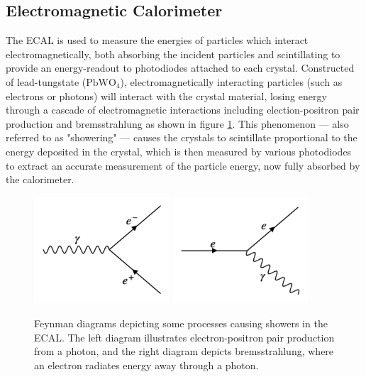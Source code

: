 \subsection{Electromagnetic Calorimeter}
\label{subsec:ecal}
The ECAL is used to measure the energies of particles which interact electromagnetically, both absorbing the incident particles and scintillating to provide an energy-readout to photodiodes attached to each crystal. Constructed of lead-tungstate ($\text{PbWO}_4$), electromagnetically interacting particles (such as electrons or photons) will interact with the crystal material, losing energy through a cascade of electromagnetic interactions including election-positron pair production and bremsstrahlung as shown in figure \ref{fig:ecalFeynman}. This phenomenon --- also referred to as "showering" --- causes the crystals to scintillate proportional to the energy deposited in the crystal, which is then measured by various photodiodes to extract an accurate measurement of the particle energy, now fully absorbed by the calorimeter.
\begin{figure}
	\centering
	\includegraphics[width=0.45\textwidth]{detector/figs/pairProduction}
	\includegraphics[width=0.45\textwidth]{detector/figs/brem}
	\renewcommand{\baselinestretch}{1.0}
	\caption[Feynman diagrams depicting some processes causing showers in the ECAL.]{Feynman diagrams depicting some processes causing showers in the ECAL. The left diagram illustrates electron-positron pair production from a photon, and the right diagram depicts bremsstrahlung, where an electron radiates energy away through a photon.}
	\label{fig:ecalFeynman}
\end{figure}

